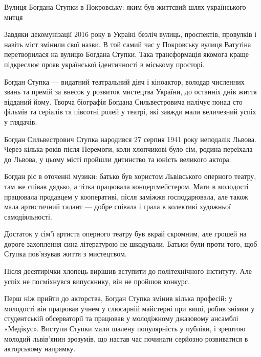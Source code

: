  
 
 
 
 

Вулиця Богдана Ступки в Покровську: яким був життєвий шлях українського митця

Завдяки декомунізації 2016 року в Україні безліч вулиць, проспектів, провулків
і навіть міст змінили свої назви. В той самий час у Покровську вулиця Ватутіна
перетворилася на вулицю Богдана Ступки. Така трансформація якомога краще
підкреслює прояв української ідентичності в міському просторі.

Богдан Ступка — видатний театральний діяч і кіноактор, володар численних звань
та премій за внесок у розвиток мистецтва України, до останніх днів життя
відданий йому. Творча біографія Богдана Сильвестровича налічує понад сто
фільмів та серіалів та півсотні ролей у театрі, які завжди мали величезний
успіх у глядачів. 

Богдан Сильвестрович Ступка народився 27 серпня 1941 року неподалік Львова.
Через кілька років після Перемоги, коли хлопчикові було сім, родина переїхала
до Львова, у цьому місті пройшли дитинство та юність великого актора.

Богдан ріс в оточенні музики: батько був хористом Львівського оперного театру,
там же співав дядько, а тітка працювала концертмейстером. Мати в молодості
працювала продавцем у кооперативі, після заміжжя господарювала, але також мала
артистичний талант — добре співала і грала в колективі художньої
самодіяльності.

Достаток у сім'ї артиста оперного театру був вкрай скромним, але грошей на
дороге захоплення сина літературою не шкодували. Батьки були проти того, щоб
Ступка пов'язував життя з мистецтвом.

Після десятирічки хлопець вирішив вступити до політехнічного інституту. Але
успіх не посміхнувся випускнику, він не пройшов конкурс.

Перш ніж прийти до акторства, Богдан Ступка змінив кілька професій: у молодості
він працював учнем у слюсарній майстерні при виші, робив знімки у студентській
обсерваторії та працював у молодіжному джазовому ансамблі «Медікус». Виступи
Ступки мали шалену популярність у публіки, і зрештою молодий львів'янин
зрозумів, що настав час починати серйозно розвиватися в акторському напрямку.

